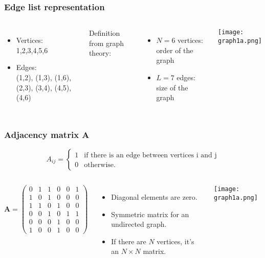 \documentclass[10pt,aspectratio=169,dvipsnames]{beamer}
\let\olditem\item
\renewcommand{\item}{%
\olditem\vspace{5pt}}
\begin{document}
\begin{frame}
\frametitle{Edge list representation}
  \begin{columns}
\begin{itemize}
\item Vertices:\\
1,2,3,4,5,6\\
\item Edges:\\
(1,2), (1,3), (1,6), (2,3), (3,4), (4,5), (4,6)
\end{itemize}
Definition from graph theory:
\begin{itemize}
\item $N=6$ vertices: \alert{order} of the graph\\
\item $L=7$ edges: \alert{size} of the graph
\end{itemize}
\texttt{[image: graph1a.png]}
  \end{columns}
\end{frame}
\begin{frame}
\frametitle{Adjacency matrix $\mathbf{A}$}
\begin{equation*}
A_{ij} = \begin{cases} 1 &\mbox{if there is an edge between vertices i and j} \\
0 & \mbox{otherwise}. \end{cases}
\end{equation*}
\begin{columns}
\begin{equation*}
\mathbf{A}=\left(\begin{matrix}
0 & 1 & 1 & 0 & 0 & 1\\
1 & 0 & 1 & 0 & 0 & 0\\
1 & 1 & 0 & 1 & 0 & 0\\
0 & 0 & 1 & 0 & 1 & 1\\
0 & 0 & 0 & 1 & 0 & 0\\
1 & 0 & 0 & 1 & 0 & 0
\end{matrix}\right)
\end{equation*}
\begin{itemize}
\item Diagonal elements are zero.
\item Symmetric matrix for an undirected graph.
\item If there are $N$ vertices, it's an $N\times N$ matrix.
\end{itemize}
\texttt{[image: graph1a.png]}
  \end{columns}
\end{frame}
\end{document}

